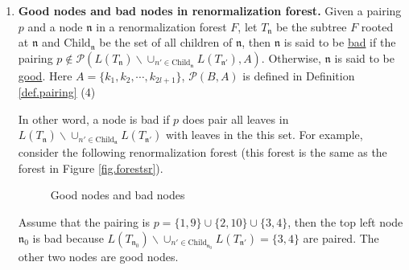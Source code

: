 \begin{defn}
\begin{enumerate}
 \item \textbf{Good nodes and bad nodes in renormalization forest.} Given a pairing $p$ and a node $\mathfrak{n}$ in a renormalization forest $F$, let $T_{\mathfrak{n}}$ be the subtree $F$ rooted at $\mathfrak{n}$ and $\text{Child}_{\mathfrak{n}}$ be the set of all children of $\mathfrak{n}$, then $\mathfrak{n}$ is said to be \underline{bad} if the pairing $p\notin \mathcal{P}(L(T_{\mathfrak{n}})\backslash\cup_{n'\in \text{Child}_{\mathfrak{n}}} L(T_{\mathfrak{n}'}),A)$. Otherwise, $\mathfrak{n}$ is said to be \underline{good}. Here $A=\{k_1,k_2,\cdots,k_{2l+1}\}$, $\mathcal{P}(B,A)$ is defined in Definition \ref{def.pairing} (4)
 
 In other word, a node is bad if $p$ does pair all leaves in $L(T_{\mathfrak{n}})\backslash\cup_{n'\in \text{Child}_{\mathfrak{n}}} L(T_{\mathfrak{n}'})$ with leaves in the this set. For example, consider the following renormalization forest (this forest is the same as the forest in Figure \ref{fig.forestsr}).
 \begin{figure}[H]
 \centering
 \caption{Good nodes and bad nodes}
 \label{fig.goodbadnodes}
 \end{figure}
 Assume that the pairing is $p=\{1,9\}\cup\{2,10\}\cup\{3,4\}$, then the top left node $\mathfrak{n}_0$ is bad because $L(T_{\mathfrak{n}_0})\backslash\cup_{n'\in \text{Child}_{\mathfrak{n}_0}} L(T_{\mathfrak{n}'})=\{3,4\}$ are paired. The other two nodes are good nodes.


\end{enumerate}
\end{defn}
